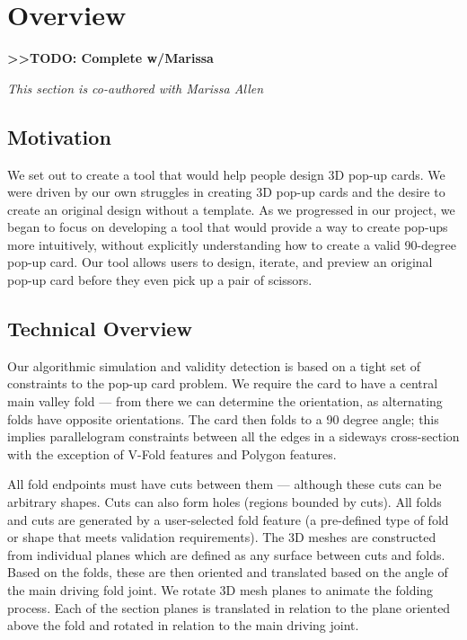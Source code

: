\section{Overview}\label{overview}

\textbf{\textgreater{}\textgreater{}TODO: Complete w/Marissa}

\emph{This section is co-authored with Marissa Allen}

\subsection{Motivation}\label{motivation}

We set out to create a tool that would help people design 3D pop-up
cards. We were driven by our own struggles in creating 3D pop-up cards
and the desire to create an original design without a template. As we
progressed in our project, we began to focus on developing a tool that
would provide a way to create pop-ups more intuitively, without
explicitly understanding how to create a valid 90-degree pop-up card.
Our tool allows users to design, iterate, and preview an original pop-up
card before they even pick up a pair of scissors.

\subsection{Technical Overview}\label{technical-overview}

Our algorithmic simulation and validity detection is based on a tight
set of constraints to the pop-up card problem. We require the card to
have a central main valley fold --- from there we can determine the
orientation, as alternating folds have opposite orientations. The card
then folds to a 90 degree angle; this implies parallelogram constraints
between all the edges in a sideways cross-section with the exception of
V-Fold features and Polygon features.

All fold endpoints must have cuts between them --- although these cuts
can be arbitrary shapes. Cuts can also form holes (regions bounded by
cuts). All folds and cuts are generated by a user-selected fold feature
(a pre-defined type of fold or shape that meets validation
requirements). The 3D meshes are constructed from individual planes
which are defined as any surface between cuts and folds. Based on the
folds, these are then oriented and translated based on the angle of the
main driving fold joint. We rotate 3D mesh planes to animate the folding
process. Each of the section planes is translated in relation to the
plane oriented above the fold and rotated in relation to the main
driving joint.

